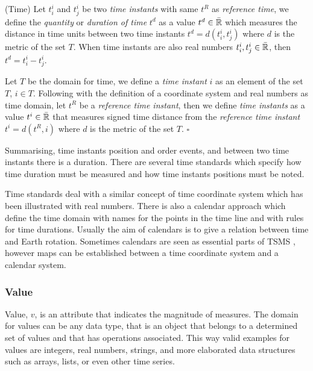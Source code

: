 \begin{definition}(Time)
  \label{def:model:temps}
  Let $t^i_i$ and $t^i_j$ be two \emph{time instants} with same $t^R$
  as \emph{reference time}, we define the \emph{quantity} or
  \emph{duration of time} $t^d$ as a value $t^d \in\bar{\mathbb{R}}$ which measures
  the distance in time units between two time instants $t^d =
  d(t^i_i,t^i_j)$ where $d$ is the metric of the set $T$. When time
  instants are also real numbers $t^i_i , t^i_j \in \bar{\mathbb{R}}$, then $t^d =
  t^i_i - t^i_j$.

  Let $T$ be the domain for time, we define a \emph{time instant} $i$
  as an element of the set $T$, $i \in T$. Following with the definition of
  a coordinate system and real numbers as time domain, let $t^{R}$ be
  a \emph{reference time instant}, then we define \emph{time instants}
  as a value $t^i \in\bar{\mathbb{R}}$ that measures signed time distance from the
  \emph{reference time instant} $t^i= d(t^{R},i)$ where $d$ is the
  metric of the set $T$. $\square$
\end{definition}

Summarising, time instants position and order events, and between two
time instants there is a duration.  There are several time standards
\cite{allen:timescales} which specify how time duration must be
measured and how time instants positions must be noted.

Time standards deal with a similar concept of time coordinate system
which has been illustrated with real numbers. There is also a calendar
approach which define the time domain with names for the points in the
time line and with rules for time durations. Usually the aim of
calendars is to give a relation between time and Earth
rotation. Sometimes calendars are seen as essential parts of TSMS
\cite{dreyer94}, however maps can be established between a time
coordinate system and a calendar system.



\subsubsection{Value}

Value, $v$, is an attribute that indicates the magnitude of measures. The
domain for values can be any data type, that is an object that belongs
to a determined set of values and that has operations associated.
This way valid examples for values are integers, real numbers,
strings, and more elaborated data structures such as arrays, lists, or
even other time series.

